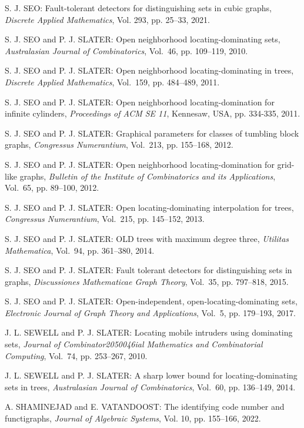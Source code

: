 \begin{thebibliography}{999}
S. J. SEO: Fault-tolerant detectors for distinguishing sets in cubic graphs, {\it Discrete Applied Mathematics}, Vol. 293, pp. 25--33, 2021.

S. J. SEO and P. J. SLATER: Open neighborhood locating-dominating sets, {\it Australasian Journal of Combinatorics}, Vol.~46, pp. 109--119, 2010.

S. J. SEO and P. J. SLATER: Open neighborhood locating-dominating in trees, {\it Discrete Applied Mathematics}, Vol.~159, pp. 484--489, 2011. 

S. J. SEO and P. J. SLATER: Open neighborhood locating-domination for infinite cylinders, {\it Proceedings of ACM SE 11}, Kennesaw, USA, pp. 334-335, 2011.

S. J. SEO and P. J. SLATER: Graphical parameters for classes of tumbling block graphs, {\it Congressus Numerantium}, Vol.~213, pp. 155--168, 2012.

S. J. SEO and P. J. SLATER: Open neighborhood locating-domination for grid-like graphs, {\it Bulletin of the Institute of Combinatorics and its Applications}, Vol.~65, pp. 89--100, 2012.

S. J. SEO and P. J. SLATER: Open locating-dominating interpolation for trees, {\it Congressus Numerantium}, Vol.~215, pp. 145--152, 2013.

S. J. SEO and P. J. SLATER: OLD trees with maximum degree three, {\it Utilitas Mathematica}, Vol.~94, pp. 361--380, 2014.

S. J. SEO and P. J. SLATER: Fault tolerant detectors for distinguishing sets in graphs, {\it Discussiones Mathematicae Graph Theory}, Vol.~35, pp. 797--818, 2015. 
  
S. J. SEO and P. J. SLATER: Open-independent, open-locating-dominating sets, {\it Electronic Journal of Graph Theory and Applications}, Vol.~5, pp. 179--193, 2017.

J. L. SEWELL and P. J. SLATER: Locating mobile intruders using dominating sets, {\it Journal of Combinator2050046ial Mathematics and Combinatorial Computing}, Vol.~74, pp. 253--267, 2010.

J. L. SEWELL and P. J. SLATER: A sharp lower bound for locating-dominating sets in trees, {\it Australasian Journal of Combinatorics}, Vol.~60, pp. 136--149, 2014.

A. SHAMINEJAD and E. VATANDOOST: The identifying code number and functigraphs, {\it Journal of Algebraic Systems}, Vol. 10, pp. 155--166, 2022.


\end{thebibliography}
